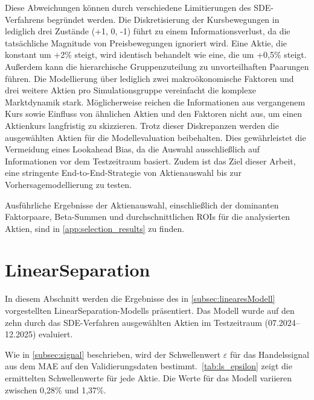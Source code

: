 Diese Abweichungen können durch verschiedene Limitierungen des SDE-Verfahrens begründet werden. Die Diskretisierung der Kursbewegungen in lediglich drei Zustände (+1, 0, -1) führt zu einem Informationsverlust, da die tatsächliche Magnitude von Preisbewegungen ignoriert wird. Eine Aktie, die konstant um +2\% steigt, wird identisch behandelt wie eine, die um +0,5\% steigt. Außerdem kann die hierarchische Gruppenzuteilung zu unvorteilhaften Paarungen führen. Die Modellierung über lediglich zwei makroökonomische Faktoren und drei weitere Aktien pro Simulationsgruppe vereinfacht die komplexe Marktdynamik stark. Möglicherweise reichen die Informationen aus vergangenem Kurs sowie Einfluss von ähnlichen Aktien und den Faktoren nicht aus, um einen Aktienkurs langfristig zu skizzieren.
Trotz dieser Diskrepanzen werden die ausgewählten Aktien für die Modellevaluation beibehalten. Dies gewährleistet die Vermeidung eines Lookahead Bias, da die Auswahl ausschließlich auf Informationen vor dem Testzeitraum basiert. Zudem ist das Ziel dieser Arbeit, eine stringente End-to-End-Strategie von Aktienauswahl bis zur Vorhersagemodellierung zu testen.

Ausführliche Ergebnisse der Aktienauswahl, einschließlich der dominanten Faktorpaare, Beta-Summen und durchschnittlichen ROIs für die analysierten Aktien, sind in \cref{app:selection_results} zu finden.

\section{LinearSeparation}\label{sec:linearseparation}



In diesem Abschnitt werden die Ergebnisse des in \cref{subsec:linearesModell} vorgestellten Linear\-Separation-Modells präsentiert. Das Modell wurde auf den zehn durch das SDE-Verfahren ausgewählten Aktien im Testzeitraum (07.2024--12.2025) evaluiert.

Wie in \cref{subsec:signal} beschrieben, wird der Schwellenwert $\varepsilon$ für das Handelssignal aus dem \ac{MAE} auf den Validierungsdaten bestimmt.~\cref{tab:ls_epsilon} zeigt die ermittelten Schwellenwerte für jede Aktie. Die Werte für das Modell variieren zwischen 0,28\% und 1,37\%.

